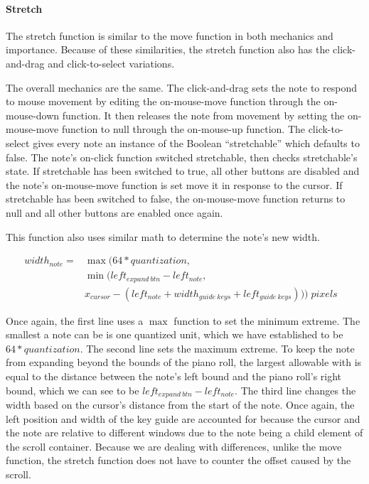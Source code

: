 \paragraph{Stretch}

The stretch function is similar to the move function in both mechanics and importance. Because of
these similarities, the stretch function also has the click-and-drag and click-to-select variations.

The overall mechanics are the same. The click-and-drag sets the note to respond to mouse movement
by editing the on-mouse-move function through the on-mouse-down function. It then releases the note
from movement by setting the on-mouse-move function to null through the on-mouse-up function. The
click-to-select gives every note an instance of the Boolean “stretchable” which defaults to false.
The note’s on-click function switched stretchable, then checks stretchable’s state. If stretchable
has been switched to true, all other buttons are disabled and the note’s on-mouse-move function is
set move it in response to the cursor. If stretchable has been switched to false, the on-mouse-move
function returns to null and all other buttons are enabled once again.

This function also uses similar math to determine the note’s new width.

\begin{align} \label{stretch}
  width_{note} = &\max( 64 * quantization,                                                          \\
                 & \min(left_{expand\:btn} - left_{note},                                           \\
                 & x_{cursor} - (left_{note} + width_{guide\:keys} + left_{guide\:keys}))) \;pixels &
\end{align}

Once again, the first line uses a $ \max $ function to set the minimum extreme. The smallest a note
can be is one quantized unit, which we have established to be $ 64 * quantization $. The second
line sets the maximum extreme. To keep the note from expanding beyond the bounds of the piano roll,
the largest allowable with is equal to the distance between the note’s left bound and the piano
roll’s right bound, which we can see to be $ left_{expand\:btn} - left_{note} $. The third line
changes the width based on the cursor’s distance from the start of the note. Once again, the left
position and width of the key guide are accounted for because the cursor and the note are relative
to different windows due to the note being a child element of the scroll container. Because we are
dealing with differences, unlike the move function, the stretch function does not have to counter
the offset caused by the scroll.

